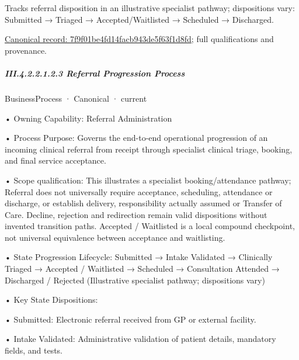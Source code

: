 Tracks referral disposition in an illustrative specialist pathway; dispositions vary: Submitted → Triaged → Accepted/Waitlisted → Scheduled → Discharged.


{\footnotesize \href{../../../../../../../../continuum/business/business-function/7f9f01be4fd14facb943de5f63f1d8fd.md}{Canonical record: 7f9f01be4fd14facb943de5f63f1d8fd}; full qualifications and provenance.}\par
\subparagraph*{III.4.2.2.1.2.3 Referral Progression Process}
\label{navigation:III.4.2.2.1.2.3}

\label{element:cfb714e9320647ffa1dffc80dddd01d9}
{\small BusinessProcess · Canonical · current}\par

•
Owning Capability: Referral Administration



•
Process Purpose: Governs the end-to-end operational progression of an incoming clinical referral from receipt through specialist clinical triage, booking, and final service acceptance.



•
Scope qualification: This illustrates a specialist booking/attendance pathway; Referral does not universally require acceptance, scheduling, attendance or discharge, or establish delivery, responsibility actually assumed or Transfer of Care. Decline, rejection and redirection remain valid dispositions without invented transition paths. Accepted / Waitlisted is a local compound checkpoint, not universal equivalence between acceptance and waitlisting.



•
State Progression Lifecycle: Submitted → Intake Validated → Clinically Triaged → Accepted / Waitlisted → Scheduled → Consultation Attended → Discharged / Rejected   (Illustrative specialist pathway; dispositions vary)



•
Key State Dispositions:



•
Submitted: Electronic referral received from GP or external facility.



•
Intake Validated: Administrative validation of patient details, mandatory fields, and tests.



